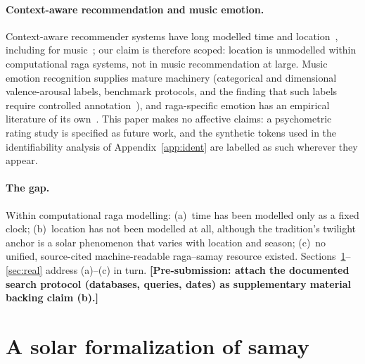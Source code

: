 \documentclass[11pt]{article}
\newcommand{\todo}[1]{\textbf{[#1]}}
\begin{document}
\paragraph{Context-aware recommendation and music emotion.}
Context-aware recommender systems have long modelled time and
location~\cite{adomavicius}, including for music~\cite{kaminskas}; our claim
is therefore scoped: location is unmodelled within computational raga
systems, not in music recommendation at large. Music emotion recognition
supplies mature machinery (categorical and dimensional valence-arousal
labels, benchmark protocols, and the finding that such labels require
controlled annotation~\cite{deam}), and raga-specific emotion has an
empirical literature of its own~\cite{mathur,balkwill,basu}. This paper makes
no affective claims: a psychometric rating study is specified as future work,
and the synthetic tokens used in the identifiability analysis of
Appendix~\ref{app:ident} are labelled as such wherever they appear.

\paragraph{The gap.}
Within computational raga modelling: (a)~time has been modelled only as a
fixed clock; (b)~location has not been modelled at all, although the
tradition's twilight anchor is a solar phenomenon that varies with location
and season; (c)~no unified, source-cited machine-readable raga--samay
resource existed. Sections~\ref{sec:formal}--\ref{sec:real} address
(a)--(c) in turn. \todo{Pre-submission: attach the documented search protocol
(databases, queries, dates) as supplementary material backing claim (b).}

\section{A solar formalization of samay}\label{sec:formal}
\end{document}
